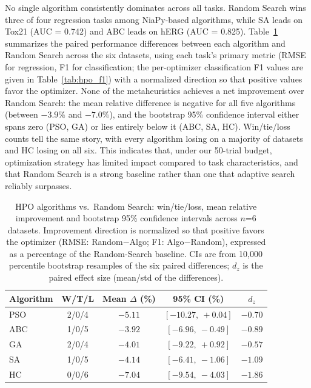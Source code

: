 \documentclass[journal]{IEEEtran}
\begin{document}
No single algorithm consistently dominates across all tasks. Random Search wins three of four regression tasks among NiaPy-based algorithms, while SA leads on Tox21 (AUC = 0.742) and ABC leads on hERG (AUC = 0.825). Table~\ref{tab:ci_comparison} summarizes the paired performance differences between each algorithm and Random Search across the six datasets, using each task's primary metric (RMSE for regression, F1 for classification; the per-optimizer classification F1 values are given in Table~\ref{tab:hpo_f1}) with a normalized direction so that positive values favor the optimizer. None of the metaheuristics achieves a net improvement over Random Search: the mean relative difference is negative for all five algorithms (between $-3.9\%$ and $-7.0\%$), and the bootstrap 95\% confidence interval either spans zero (PSO, GA) or lies entirely below it (ABC, SA, HC). Win/tie/loss counts tell the same story, with every algorithm losing on a majority of datasets and HC losing on all six. This indicates that, under our 50-trial budget, optimization strategy has limited impact compared to task characteristics, and that Random Search is a strong baseline rather than one that adaptive search reliably surpasses.

\begin{table}[!t]
\centering
\caption{HPO algorithms vs.\ Random Search: win/tie/loss, mean relative improvement and bootstrap 95\% confidence intervals across $n$=6 datasets. Improvement direction is normalized so that positive favors the optimizer (RMSE: Random$-$Algo; F1: Algo$-$Random), expressed as a percentage of the Random-Search baseline. CIs are from 10{,}000 percentile bootstrap resamples of the six paired differences; $d_z$ is the paired effect size (mean/std of the differences).}
\label{tab:ci_comparison}
\small
\setlength{\tabcolsep}{4pt}
\begin{tabular}{lcccc}
\toprule
\textbf{Algorithm} & \textbf{W/T/L} & \textbf{Mean $\Delta$ (\%)} & \textbf{95\% CI (\%)} & \textbf{$d_z$} \\
\midrule
PSO & 2/0/4 & $-5.11$ & $[-10.27,\ +0.04]$ & $-0.70$ \\
ABC & 1/0/5 & $-3.92$ & $[-6.96,\ -0.49]$ & $-0.89$ \\
GA  & 2/0/4 & $-4.01$ & $[-9.22,\ +0.92]$ & $-0.57$ \\
SA  & 1/0/5 & $-4.14$ & $[-6.41,\ -1.06]$ & $-1.09$ \\
HC  & 0/0/6 & $-7.04$ & $[-9.54,\ -4.03]$ & $-1.86$ \\
\bottomrule
\end{tabular}
\end{table}
\end{document}
